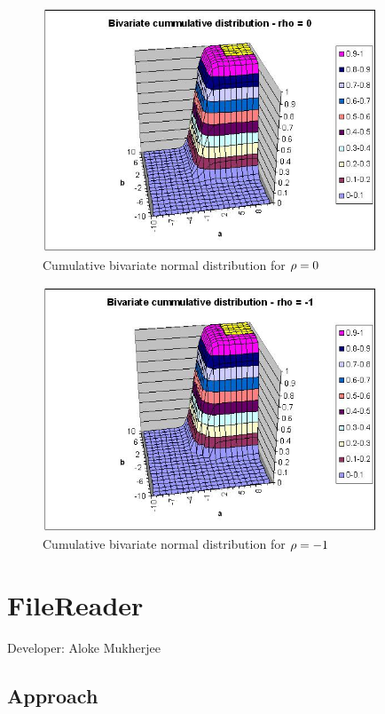 \begin{figure}
\begin{center}    
        \includegraphics[width=10cm]{Bivn0.jpg}
        \caption{Cumulative bivariate normal distribution for $\rho=0$}
\end{center}
\end{figure}

\begin{figure}
\begin{center}    
        \includegraphics[width=10cm]{BivnNeg1.jpg}
        \caption{Cumulative bivariate normal distribution for $\rho=-1$}
\end{center}
\end{figure}


\newpage

\section{FileReader}

Developer: Aloke Mukherjee

\subsection{Approach}

